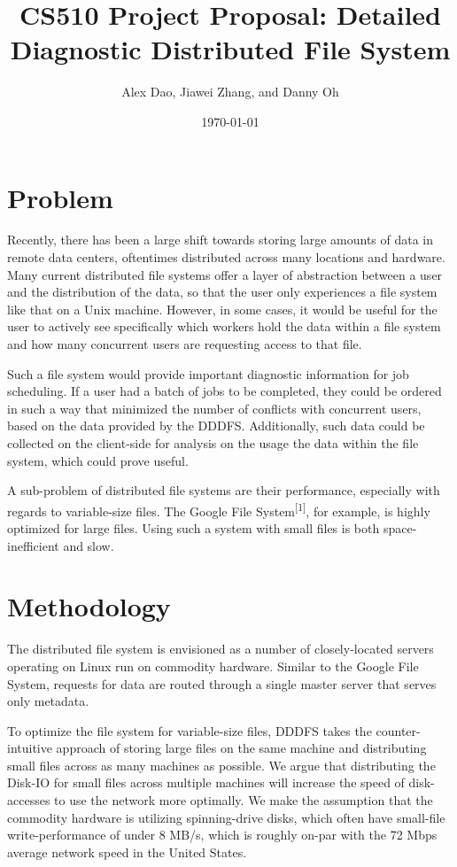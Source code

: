 \documentclass{article}
\title{CS510 Project Proposal: Detailed Diagnostic Distributed File System}
\date{\today}
\author{Alex Dao, Jiawei Zhang, and Danny Oh}
\begin{document}
\maketitle

\section{Problem}
Recently, there has been a large shift towards storing large amounts of data in remote data centers, oftentimes distributed across many locations and hardware. Many current distributed file systems offer a layer of abstraction between a user and the distribution of the data, so that the user only experiences a file system like that on a Unix machine. However, in some cases, it would be useful for the user to actively see specifically which workers hold the data within a file system and how many concurrent users are requesting access to that file. 

Such a file system would provide important diagnostic information for job scheduling. If a user had a batch of jobs to be completed, they could be ordered in such a way that minimized the number of conflicts with concurrent users, based on the data provided by the DDDFS. Additionally, such data could be collected on the client-side for analysis on the usage the data within the file system, which could prove useful.

A sub-problem of distributed file systems are their performance, especially with regards to variable-size files. The Google File System\textsuperscript{[1]}, for example, is highly optimized for large files. Using such a system with small files is both space-inefficient and slow. 

\section{Methodology} 

The distributed file system is envisioned as a number of closely-located servers operating on Linux run on commodity hardware. Similar to the Google File System, requests for data are routed through a single master server that serves only metadata. 

To optimize the file system for variable-size files, DDDFS takes the counter-intuitive approach of storing large files on the same machine and distributing small files across as many machines as possible. We argue that distributing the Disk-IO for small files across multiple machines will increase the speed of disk-accesses to use the network more optimally. We make the assumption that the commodity hardware is utilizing spinning-drive disks, which often have small-file write-performance of under 8 MB/s, which is roughly on-par with the 72 Mbps average network speed in the United States. 
\end{document}
